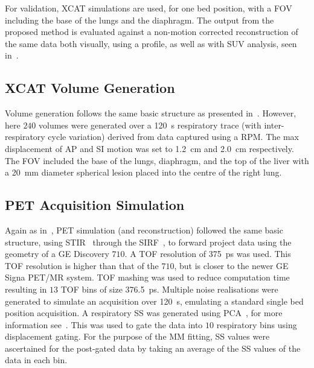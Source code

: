             For validation, \gls{XCAT} simulations are used, for one bed position, with a \gls{FOV} including the base of the lungs and the diaphragm. The output from the proposed method is evaluated against a non-motion corrected reconstruction of the same data both visually, using a profile, as well as with \gls{SUV} analysis, seen in~.
            
            \subsection{XCAT Volume Generation} \label{sec:pet_ct_respiratory_motion_correction_with_a_single_attenuation_map_using_nac_derived_deformation_fields_methods_xcat_volume_generation}
                Volume generation follows the same basic structure as presented in~. However, here $240$ volumes were generated over a \SI{120}{\second} respiratory trace (with inter-respiratory cycle variation) derived from data captured using a \gls{RPM}. The max displacement of \gls{AP} and \gls{SI} motion was set to \SI{1.2}{\centi\metre} and \SI{2.0}{\centi\metre} respectively. The \gls{FOV} included the base of the lungs, diaphragm, and the top of the liver with a \SI{20}{\milli\metre} diameter spherical lesion placed into the centre of the right lung.
    
            \subsection{PET Acquisition Simulation} \label{sec:pet_ct_respiratory_motion_correction_with_a_single_attenuation_map_using_nac_derived_deformation_fields_methods_pet_acquisition_simulation}
                Again as in~, \gls{PET} simulation (and reconstruction) followed the same basic structure, using \gls{STIR}~\parencite{Thielemans2012, Nikos2019, Wadhwa2021PETLibrary} through the \gls{SIRF}~\parencite{Ovtchinnikov2017}, to forward project data using the geometry of a \gls{GE} Discovery $710$.  A \gls{TOF} resolution of \SI{375}{\pico\second} was used. This \gls{TOF} resolution is higher than that of the $710$, but is closer to the newer \gls{GE} Signa \gls{PET}/\gls{MR} system. \gls{TOF} mashing was used to reduce computation time resulting in $13$ \gls{TOF} bins of size \SI{376.5}{\pico\second}. Multiple noise realisations were generated to simulate an acquisition over \SI{120}{\second}, emulating a standard single bed position acquisition. A respiratory \gls{SS} was generated using \gls{PCA}~\parencite{Thielemans2011}, for more information see~. This was used to gate the data into $10$ respiratory bins using displacement gating. For the purpose of the \gls{MM} fitting, \gls{SS} values were ascertained for the post-gated data by taking an average of the \gls{SS} values of the data in each bin.
            
